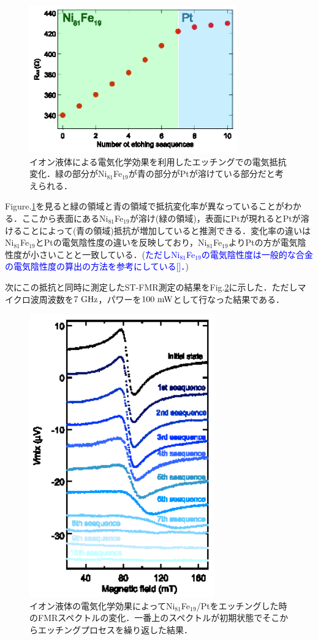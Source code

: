 \begin{figure}[htbp]
\centerline{
\includegraphics[width=9cm]{images/resichange_after.eps}
}
\caption{イオン液体による電気化学効果を利用したエッチングでの電気抵抗変化．緑の部分がNi$_{81}$Fe$_{19}$が青の部分がPtが溶けている部分だと考えられる．
}
\label{fig:resichange_after}
\end{figure}

Figure.\ref{fig:resichange_after}を見ると緑の領域と青の領域で抵抗変化率が異なっていることがわかる．ここから表面にあるNi$_{81}$Fe$_{19}$が溶け(緑の領域)，表面にPtが現れるとPtが溶けることによって(青の領域)抵抗が増加していると推測できる．変化率の違いはNi$_{81}$Fe$_{19}$とPtの電気陰性度の違いを反映しており，Ni$_{81}$Fe$_{19}$よりPtの方が電気陰性度が小さいことと一致している．(\textcolor{blue}{ただしNi$_{81}$Fe$_{19}$の電気陰性度は一般的な合金の電気陰性度の算出の方法を参考にしている[]．})

次にこの抵抗と同時に測定したST-FMR測定の結果をFig.\ref{fig:melting_after}に示した．ただしマイクロ波周波数を$7\rm\ GHz$，パワーを$100\rm\ mW$として行なった結果である．

\begin{figure}[htbp]
\centerline{
\includegraphics[width=8cm]{images/melting_after.eps}
}
\caption{イオン液体の電気化学効果によってNi$_{81}$Fe$_{19}$/Ptをエッチングした時のFMRスペクトルの変化．一番上のスペクトルが初期状態でそこからエッチングプロセスを繰り返した結果．
}
\label{fig:melting_after}
\end{figure}

